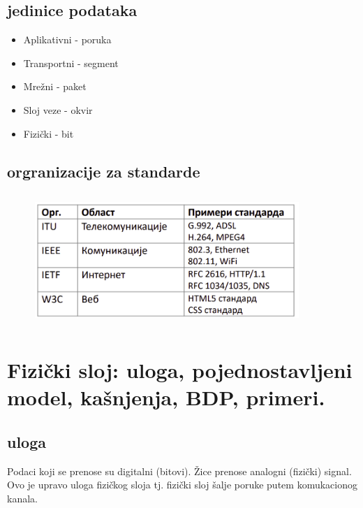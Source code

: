\documentclass[a4paper]{article}
\begin{document}
    \subsection{jedinice podataka}
        \begin{itemize}
            \item Aplikativni - poruka
            \item Transportni - segment
            \item Mrežni - paket
            \item Sloj veze - okvir
            \item Fizički - bit
        \end{itemize}
        \subsection{orgranizacije za standarde}
        \begin{figure}[H]
            \begin{center}
                \includegraphics[width=100mm,height=50mm]{Slike/std_table.png}
            \end{center}
        \end{figure}

\section{Fizički sloj: uloga, pojednostavljeni model, kašnjenja, BDP, primeri. }
    \subsection{uloga}
        Podaci koji se prenose su digitalni (bitovi). Žice prenose analogni (fizički) signal. Ovo je 
        upravo uloga fizičkog sloja tj. fizički sloj šalje poruke putem komukacionog kanala. 
\end{document}
